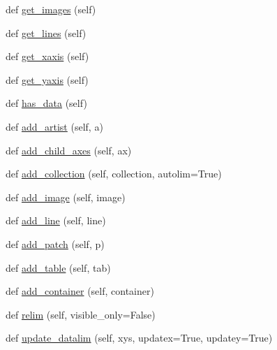 \begin{DoxyCompactItemize}
\item 
def \hyperlink{classmatplotlib_1_1axes_1_1__base_1_1__AxesBase_a600d76f818e7c3249c4619c20826726c}{get\+\_\+images} (self)
\item 
def \hyperlink{classmatplotlib_1_1axes_1_1__base_1_1__AxesBase_afccd14c7579714503fda93e7bad0da1a}{get\+\_\+lines} (self)
\item 
def \hyperlink{classmatplotlib_1_1axes_1_1__base_1_1__AxesBase_ad2ccbe3213fcc1b7441d1751dec32773}{get\+\_\+xaxis} (self)
\item 
def \hyperlink{classmatplotlib_1_1axes_1_1__base_1_1__AxesBase_a22968edec3ef531f13668d456bc95fff}{get\+\_\+yaxis} (self)
\item 
def \hyperlink{classmatplotlib_1_1axes_1_1__base_1_1__AxesBase_ac2f0e104a3b9769b777abdeb51956aad}{has\+\_\+data} (self)
\item 
def \hyperlink{classmatplotlib_1_1axes_1_1__base_1_1__AxesBase_af8372347b2926f2e3a7100b1e8ad87e2}{add\+\_\+artist} (self, a)
\item 
def \hyperlink{classmatplotlib_1_1axes_1_1__base_1_1__AxesBase_adf28977e60b5e7467b21b8c26c5d10ba}{add\+\_\+child\+\_\+axes} (self, ax)
\item 
def \hyperlink{classmatplotlib_1_1axes_1_1__base_1_1__AxesBase_aa36505671b067609db351ac24ebca085}{add\+\_\+collection} (self, collection, autolim=True)
\item 
def \hyperlink{classmatplotlib_1_1axes_1_1__base_1_1__AxesBase_ac6b2890700054c884c31fa1b06b0df6c}{add\+\_\+image} (self, image)
\item 
def \hyperlink{classmatplotlib_1_1axes_1_1__base_1_1__AxesBase_a92fe7e9b365f958995a75d91bdacf030}{add\+\_\+line} (self, line)
\item 
def \hyperlink{classmatplotlib_1_1axes_1_1__base_1_1__AxesBase_a30389cd6a77b970b0a75af280b43134c}{add\+\_\+patch} (self, p)
\item 
def \hyperlink{classmatplotlib_1_1axes_1_1__base_1_1__AxesBase_ad25a62ec722c28ab4fb3181f9d61392d}{add\+\_\+table} (self, tab)
\item 
def \hyperlink{classmatplotlib_1_1axes_1_1__base_1_1__AxesBase_a62d4122ff8d0d5de43f6acabc9ba06b8}{add\+\_\+container} (self, container)
\item 
def \hyperlink{classmatplotlib_1_1axes_1_1__base_1_1__AxesBase_a0deb77111cb5fa0c8805bffecd04784b}{relim} (self, visible\+\_\+only=False)
\item 
def \hyperlink{classmatplotlib_1_1axes_1_1__base_1_1__AxesBase_a9d5aa2b3144e3b5b59c63b09e3130a60}{update\+\_\+datalim} (self, xys, updatex=True, updatey=True)

\end{DoxyCompactItemize}
